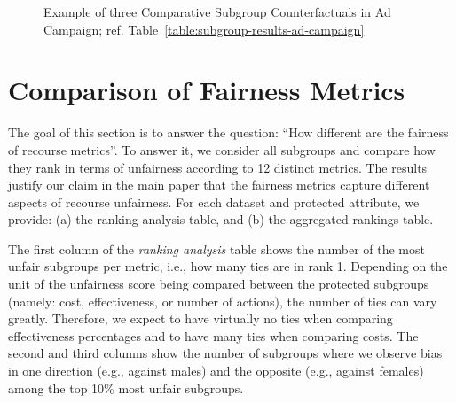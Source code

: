 \documentclass{article}
\begin{document}
\begin{figure}[ht]
\begin{minipage}{1\linewidth}
\caption{Example of three Comparative Subgroup Counterfactuals in Ad Campaign; ref. Table~\ref{table:subgroup-results-ad-campaign}}
\label{fig:comparative-subgroup-counterfactuals-ad-campaign}
\end{minipage}
\end{figure}

\clearpage

\section{Comparison of Fairness Metrics}
\label{sec:comparison}

The goal of this section is to answer the question: ``How different are the fairness of recourse metrics''. To answer it, we consider all subgroups and compare how they rank in terms of unfairness according to 12 distinct metrics. The results justify our claim in the main paper that the fairness metrics capture different aspects of recourse unfairness. 
For each dataset and protected attribute, we provide: (a) the ranking analysis table, and (b) the aggregated rankings table.

The first column of the \emph{ranking analysis} table shows the number of the most unfair subgroups per metric, i.e., how many ties are in rank 1. Depending on the unit of the unfairness score being compared between the protected subgroups (namely: cost, effectiveness, or number of actions), the number of ties can vary greatly. Therefore, we expect to have virtually no ties when comparing effectiveness percentages and to have many ties when comparing costs.  
The second and third columns show the number of subgroups where we observe bias in one direction (e.g., against males) and the opposite (e.g., against females) among the top 10\% most unfair subgroups.

\end{document}

